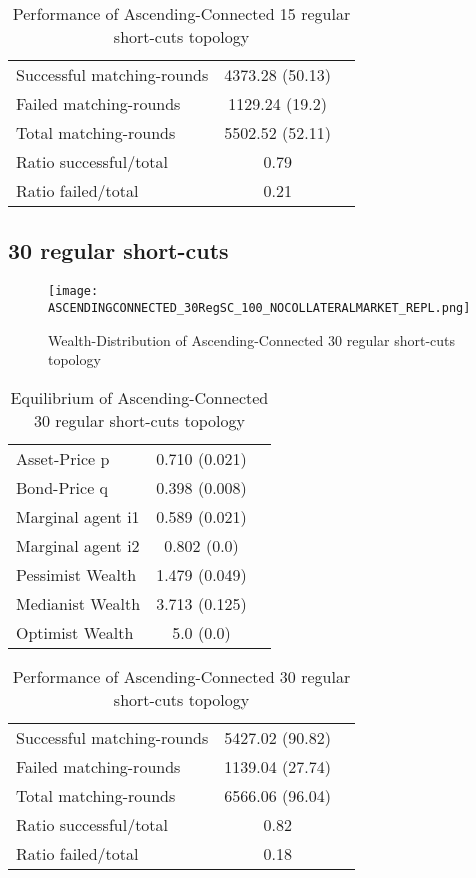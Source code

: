 \documentclass[Bachelorarbeit.tex]{subfiles}
\begin{document}
\begin{table}[H]
	\caption{Performance of Ascending-Connected 15 regular short-cuts topology}
	\centering
	\begin{tabular} { l c r }
		\hline
		Successful matching-rounds& 4373.28 (50.13) \\
		Failed matching-rounds & 1129.24 (19.2) \\
		Total matching-rounds & 5502.52 (52.11) \\
		\hline
		Ratio successful/total & 0.79 \\
		Ratio failed/total & 0.21 \\
		\hline
	\end{tabular}
\end{table}

\subsection{30 regular short-cuts}
\begin{figure}[H]
	\centering
  \texttt{[image: ASCENDINGCONNECTED\_30RegSC\_100\_NOCOLLATERALMARKET\_REPL.png]}
	\caption{Wealth-Distribution of Ascending-Connected 30 regular short-cuts topology}
	\label{fig:wealth_ASCENDINGCONNECTED_30RegSC_100_NOCOLLATERALMARKET_REPL}
\end{figure}

\begin{table}[H]
	\caption{Equilibrium of Ascending-Connected 30 regular short-cuts topology}
	\centering
	\begin{tabular} { l c r }
		\hline
		Asset-Price p & 0.710 (0.021) \\
		Bond-Price q & 0.398 (0.008) \\
		Marginal agent i1 & 0.589 (0.021) \\
		Marginal agent i2 & 0.802 (0.0) \\
		\hline
		Pessimist Wealth & 1.479 (0.049) \\
		Medianist Wealth & 3.713 (0.125) \\
		Optimist Wealth & 5.0 (0.0) \\
		\hline
	\end{tabular}
\end{table} 

\begin{table}[H]
	\caption{Performance of Ascending-Connected 30 regular short-cuts topology}
	\centering
	\begin{tabular} { l c r }
		\hline
		Successful matching-rounds& 5427.02 (90.82) \\
		Failed matching-rounds & 1139.04 (27.74) \\
		Total matching-rounds & 6566.06 (96.04) \\
		\hline
		Ratio successful/total & 0.82 \\
		Ratio failed/total & 0.18 \\
		\hline
	\end{tabular}
\end{table}
\end{document}
